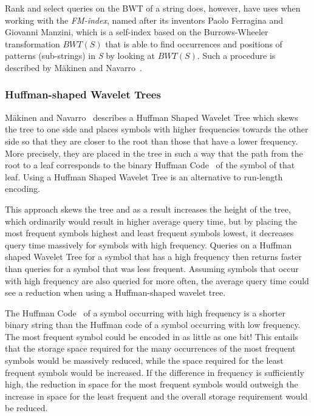 Rank and select queries on the BWT of a string does, however, have uses when working with the \textit{FM-index}, named after its inventors Paolo Ferragina and Giovanni Manzini, which is a self-index based on the Burrows-Wheeler transformation $BWT(S)$ that is able to find occurrences and positions of patterns (sub-strings) in \textit{S} by looking at $BWT(S)$. 
Such a procedure is described by Mäkinen and Navarro~.

\subsubsection{Huffman-shaped Wavelet Trees}
\label{sec:huffmanShapedWaveletTree}
Mäkinen and Navarro~ describes a Huffman Shaped Wavelet Tree which skews the tree to one side and places symbols with higher frequencies towards the other side so that they are closer to the root than those that have a lower frequency.
More precisely, they are placed in the tree in such a way that the path from the root to a leaf corresponds to the binary Huffman Code~ of the symbol of that leaf.
Using a Huffman Shaped Wavelet Tree is an alternative to run-length encoding.

This approach skews the tree and as a result increases the height of the tree, which ordinarily would result in higher average query time, but by placing the most frequent symbols highest and least frequent symbols lowest, it decreases query time massively for symbols with high frequency.
Queries on a Huffman shaped Wavelet Tree for a symbol that has a high frequency then returns faster than queries for a symbol that was less frequent.
Assuming symbols that occur with high frequency are also queried for more often, the average query time could see a reduction when using a Huffman-shaped wavelet tree.

The Huffman Code~ of a symbol occurring with high frequency is a shorter binary string than the Huffman code of a symbol occurring with low frequency.
The most frequent symbol could be encoded in as little as one bit!
This entails that the storage space required for the many occurrences of the most frequent symbols would be massively reduced, while the space required for the least frequent symbols would be increased.
If the difference in frequency is sufficiently high, the reduction in space for the most frequent symbols would outweigh the increase in space for the least frequent and the overall storage requirement would be reduced.

